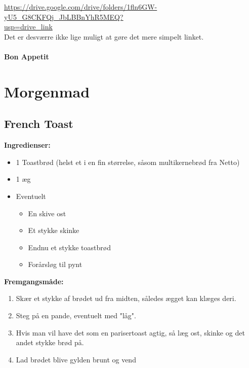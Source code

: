 \documentclass{book}
\begin{document}
\href{https://drive.google.com/drive/folders/1fln6GW-yU5_G8CKFQj_JbLBBnYhR5MEQ?usp=drive_link}{https://drive.google.com/drive/folders/1fln6GW-yU5\_G8CKFQj\_JbLBBnYhR5MEQ? \\ usp=drive\_link }
\\ Det er desværre ikke lige muligt at gøre det mere simpelt linket.
\\ \\ \textbf{Bon Appetit} 
\chapter{Morgenmad}
\minitoc
\newpage \section{French Toast}
\begin{minipage}[t]{0.5\textwidth}
\textbf{Ingredienser:}
\begin{itemize}
    \item 1 Toastbrød (helst et i en fin størrelse, såsom multikernebrød fra Netto)
    \item 1 æg
    \item Eventuelt
    \begin{itemize}
        \item En skive ost
        \item Et stykke skinke
        \item Endnu et stykke toastbrød
        \item Forårsløg til pynt
    \end{itemize}
\end{itemize}
\end{minipage}
\begin{minipage}[t]{0.5\textwidth}
\textbf{Fremgangsmåde:}
\begin{enumerate}
    \item Skær et stykke af brødet ud fra midten, således ægget kan klæges deri.
    \item Steg på en pande, eventuelt med "låg".
    \item Hvis man vil have det som en parisertoast agtig, så læg ost, skinke og det andet stykke brød på.
    \item Lad brødet blive gylden brunt og vend
\end{enumerate}
\end{minipage}
\end{document}
